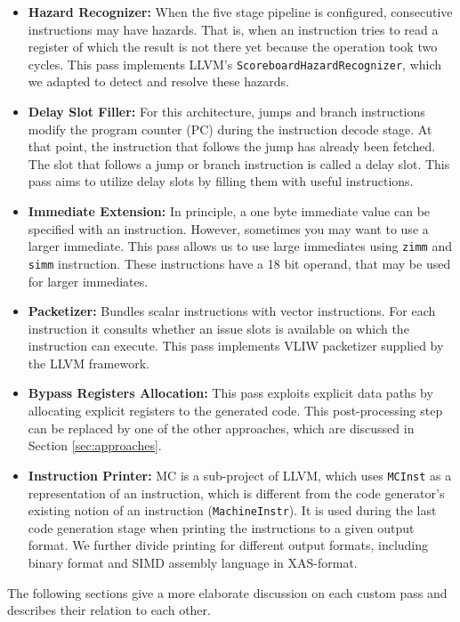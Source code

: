\begin{itemize}
	\item \textbf{Hazard Recognizer:} When the five stage pipeline is configured, consecutive instructions may have hazards. That is, when an instruction tries to read a register of which the result is not there yet because the operation took two cycles. This pass implements LLVM's \texttt{ScoreboardHazardRecognizer}, which we adapted to detect and resolve these hazards.
	\item \textbf{Delay Slot Filler:} For this architecture, jumps and branch instructions modify the program counter (PC) during the instruction decode stage. At that point, the instruction that follows the jump has already been fetched. The slot that follows a jump or branch instruction is called a delay slot. This pass aims to utilize delay slots by filling them with useful instructions.%
	\item \textbf{Immediate Extension:} In principle, a one byte immediate value can be specified with an instruction. However, sometimes you may want to use a larger immediate. This pass allows us to use large immediates using \texttt{zimm} and \texttt{simm} instruction. These instructions have a 18 bit operand, that may be used for larger immediates.%
	\item \textbf{Packetizer:} Bundles scalar instructions with vector instructions. For each instruction it consults whether an issue slots is available on which the instruction can execute. This pass implements VLIW packetizer supplied by the LLVM framework.
	\item \textbf{Bypass Registers Allocation:} This pass exploits explicit data paths by allocating explicit registers to the generated code. This post-processing step can be replaced by one of the other approaches, which are discussed in Section \ref{sec:approaches}.
	\item \textbf{Instruction Printer:} MC is a sub-project of LLVM, which uses \texttt{MCInst} as a representation of an instruction, which is different from the code generator's existing notion of an instruction (\texttt{MachineInstr}). It is used during the last code generation stage when printing the instructions to a given output format. We further divide printing for different output formats, including binary format and SIMD assembly language in XAS-format. 


\end{itemize}
The following sections give a more elaborate discussion on each custom pass and describes their relation to each other.

